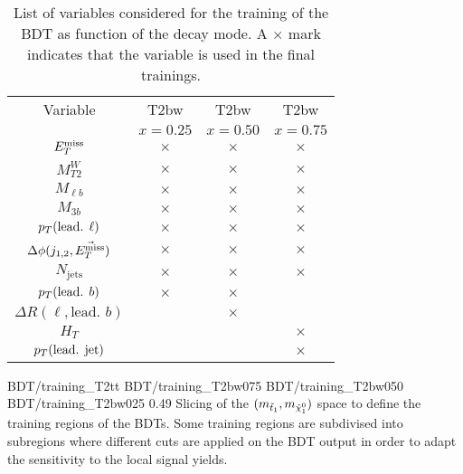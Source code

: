 \begin{table}[h!]
\begin{center}
\begin{tabular}{|c|ccc|}
                    \hline
                    Variable                            & T2bw      & T2bw      & T2bw      \\
                                                        & $x=0.25$  & $x=0.50$  & $x=0.75$  \\
                    \hline
                    $E_T^\text{miss}$                              & $\times$  & $\times$  & $\times$  \\
                    $M_{T2}^W$                          & $\times$  & $\times$  & $\times$  \\
                    $M_{\ell b}$                        & $\times$  & $\times$  & $\times$  \\
                    $M_{3 b}$                           & $\times$  & $\times$  & $\times$  \\
                    $p_T(\text{lead. } \ell)$           & $\times$  & $\times$  & $\times$  \\
                    $\Delta\phi(j_{1,2},\vec{E_T^\text{miss}})$    & $\times$  & $\times$  & $\times$  \\
                    $N_\text{jets}$                     & $\times$  & $\times$  & $\times$  \\
                    $p_T(\text{lead. } b)$              & $\times$  & $\times$  &           \\
                    $\Delta R( \ell, \text{lead. } b)$  &           & $\times$  &           \\
                    $H_{T}$                             &           &           & $\times$  \\
                    $p_T(\text{lead. jet})$             &           &           & $\times$  \\
                    \hline
                \end{tabular}
                \caption{List of variables considered for the training of the BDT
                as function of the decay mode. A $\times$ mark indicates that the variable
                is used in the final trainings.}
                \label{tab:BDTVariableUsage}
            \end{center}
        \end{table}

                              {BDT/training_T2tt}
                              {BDT/training_T2bw075}
                              {BDT/training_T2bw050}
                              {BDT/training_T2bw025}
                              {0.49}
                              {Slicing of the $(m_{\tilde{t}_1},m_{\tilde{\chi}_1^0})$ space
                              to define the training regions of the BDTs. Some training
                              regions are subdivised into subregions where different cuts
                              are applied on the BDT output in order to adapt the sensitivity
                              to the local signal yields.}

